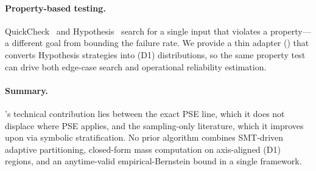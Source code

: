 \paragraph{Property-based testing.}
QuickCheck~\cite{claessen2000quickcheck} and
Hypothesis~\cite{maciver2019hypothesis} search for a single input that
violates a property---a different goal from bounding the failure rate.
We provide a thin adapter () that
converts Hypothesis strategies into (D1) distributions, so the same
property test can drive both edge-case search and operational
reliability estimation.

\paragraph{Summary.}
\toolname{}'s technical contribution lies between the exact PSE line,
which it does not displace where PSE applies, and the sampling-only
literature, which it improves upon via symbolic stratification.  No
prior algorithm combines SMT-driven adaptive partitioning, closed-form
mass computation on axis-aligned (D1) regions, and an anytime-valid
empirical-Bernstein bound in a single framework.
